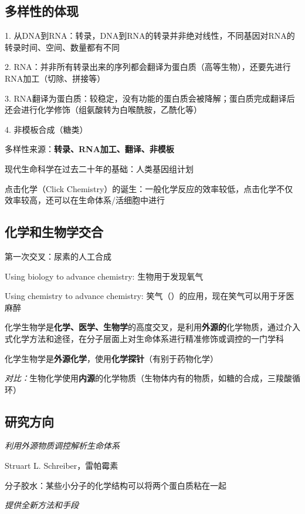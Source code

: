 \subsection{多样性的体现}%
\label{sub:多样性的体现}
1. 从DNA到RNA：转录，DNA到RNA的转录并非绝对线性，不同基因对RNA的转录时间、空间、数量都有不同

2. RNA：并非所有转录出来的序列都会翻译为蛋白质（高等生物），还要先进行RNA加工（切除、拼接等）

3. RNA翻译为蛋白质：较稳定，没有功能的蛋白质会被降解；蛋白质完成翻译后还会进行化学修饰（组氨酸转为白喉酰胺，乙酰化等）

4. 非模板合成（糖类）
\begin{notation}
    多样性来源：\textbf{转录、RNA加工、翻译、非模板}

    现代生命科学在过去二十年的基础：人类基因组计划
\end{notation}
\begin{notation}
    点击化学（Click Chemistry）的诞生：一般化学反应的效率较低，点击化学不仅效率较高，还可以在生命体系/活细胞中进行
\end{notation}
\subsection{化学和生物学交合}%
\label{sub:化学和生物学交合}
\begin{notation}
第一次交叉：尿素的人工合成
\end{notation}
Using biology to advance chemistry: 生物用于发现氧气

Using chemistry to advance chemistry: 笑气（）的应用，现在笑气可以用于牙医麻醉
\begin{defi}
    化学生物学是\textbf{化学、医学、生物学}的高度交叉，是利用\textbf{外源的}化学物质，通过介入式化学方法和途径，在分子层面上对生命体系进行精准修饰或调控的一门学科
\end{defi}
\begin{notation}
    化学生物学是\textbf{外源化学}，使用\textbf{化学探针}（有别于药物化学）
\end{notation}
\textit{对比：}生物化学使用\textbf{内源}的化学物质（生物体内有的物质，如糖的合成，三羧酸循环）
\subsection{研究方向}%
\label{sub:研究方向}
\textit{利用外源物质调控解析生命体系}

Struart L. Schreiber，雷帕霉素
\begin{eg}
    分子胶水：某些小分子的化学结构可以将两个蛋白质粘在一起
\end{eg}
\textit{提供全新方法和手段}

